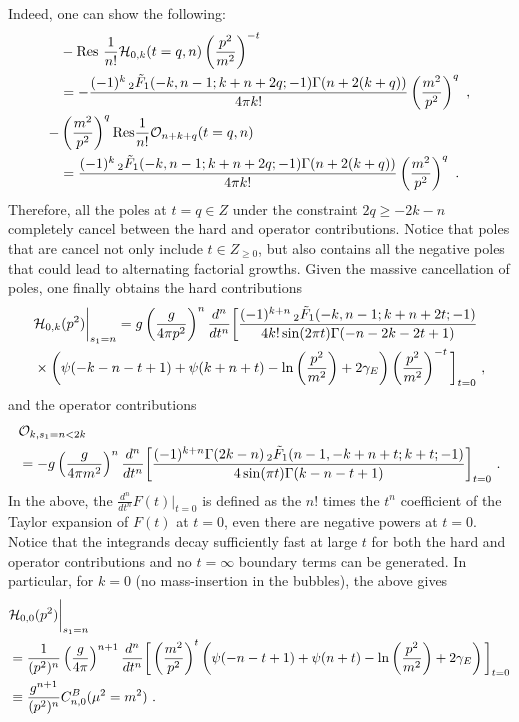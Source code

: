 \documentclass[a4paper,11pt]{article}
\begin{document}
Indeed, one can show the following:
\begin{align}
&-{\rm Res} \ \frac{1}{n!}{\cal H}_{0,k}(t=q,n)\left(\frac{p^2}{m^2}\right)^{-t}  \nonumber \\ 
&= -\frac{(-1)^k  \, _2\tilde{F}_1(-k,n-1;k+n+2 q;-1) \Gamma (n+2 (k+q))}{4 \pi  k!}\left(\frac{m^2}{p^2}\right)^{q} \ , \label{eq:poleshard}\\ 
-&\left(\frac{m^2}{p^2}\right)^{q}{\rm Res} \frac{1}{n!} {\cal O}_{n+k+q}(t=q,n)\nonumber \\ 
&=\frac{(-1)^k  \, _2\tilde{F}_1(-k,n-1;k+n+2 q;-1) \Gamma (n+2 (k+q))}{4 \pi  k!}\left(\frac{m^2}{p^2}\right)^{q} \ . \label{eq:polesope}
\end{align}
Therefore, all the poles at $t=q\in Z$ under the constraint $2q\ge-2k-n$ completely cancel between the hard and operator contributions. Notice that poles that are cancel not only include $t\in Z_{\ge 0}$, but also contains all the negative poles that could lead to alternating factorial growths. Given the massive cancellation of poles, one finally obtains the hard contributions 
\begin{align}
&{\cal H}_{0,k}(p^2)\bigg|_{s_1=n}=g\left(\frac{g}{4\pi p^2}\right)^{n} \frac{d^{n}}{dt^{n}} \bigg[\frac{ (-1)^{k+n}   \, _2\tilde{F}_1(-k,n-1;k+n+2 t;-1) }{4k! \sin(2\pi t) \Gamma (-n-2k-2t+1)} \nonumber \\ 
&\times \left(\psi(-k-n-t+1)+\psi(k+n+t)-\ln \left(\frac{p^2}{m^2}\right)+2 \gamma_E \right)\left(\frac{p^2}{m^2}\right)^{-t} \bigg]_{t=0} \ , \label{eq:hardMellin}
\end{align}
and the operator contributions
\begin{align} \label{eq:operatorfull1}
&{\cal O}_{k,s_1=n<2k}\nonumber \\ 
&=-g\left(\frac{g}{4\pi m^2}\right)^n\frac{d^n}{dt^n}\bigg[\frac{(-1)^{k+n} \Gamma (2 k-n) \, _2\tilde{F}_1(n-1,-k+n+t;k+t;-1)}{4 \sin (\pi  t) \Gamma (k-n-t+1)}\bigg]_{t=0} \ .
\end{align}
In the above,  the $\frac{d^{n}}{dt^n} F(t)|_{t=0}$ is defined as the $n!$ times the $t^n$ coefficient of the Taylor expansion of $F(t)$ at $t=0$, even there are negative powers at $t=0$. Notice that the integrands decay sufficiently fast at large $t$ for both the hard and operator contributions and no $t=\infty$ boundary terms can be generated. In particular, for $k=0$ (no mass-insertion in the bubbles), the above gives 
\begin{align}\label{eq:hard00mellin}
&{\cal H}_{0,0}(p^2)\bigg|_{s_1=n}\nonumber \\ 
&=\frac{1}{(p^2)^n}\left(\frac{g}{4\pi}\right)^{n+1} \frac{d^n}{dt^n} \bigg[\left(\frac{m^2}{p^2}\right)^t\left(\psi(-n-t+1)+\psi(n+t)-\ln \left(\frac{p^2}{m^2}\right)+2 \gamma_E \right)\bigg]_{t=0} \nonumber \\ 
& \equiv \frac{g^{n+1}}{(p^2)^n}C_{n,0}^{B}(\mu^2=m^2) \ .
\end{align}
\end{document}
